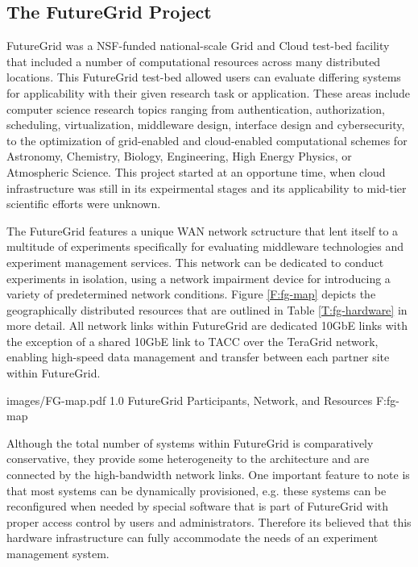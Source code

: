 \subsection{The FutureGrid Project}


FutureGrid was a NSF-funded national-scale Grid and Cloud test-bed facility that included a number of computational resources across many distributed locations.  This FutureGrid test-bed allowed users can evaluate differing systems for applicability with their given research task or application. These areas include computer science research topics ranging from authentication, authorization, scheduling, virtualization, middleware design, interface design and cybersecurity, to the optimization of grid-enabled and cloud-enabled computational schemes for  Astronomy, Chemistry, Biology, Engineering, High Energy Physics, or Atmospheric Science. This project started at an opportune time, when cloud infrastructure was still in its expeirmental stages and its applicability to mid-tier scientific efforts were unknown. 

The FutureGrid  features a unique WAN network sctructure that lent itself to a multitude of experiments specifically for evaluating middleware technologies and experiment management services.  This network can be dedicated to conduct experiments in isolation, using a network impairment device for introducing a variety of predetermined network conditions. Figure \ref{F:fg-map} depicts the geographically distributed resources that are outlined in Table \ref{T:fg-hardware} in more detail. All network links within FutureGrid are dedicated 10GbE links with the exception of a shared 10GbE link to TACC over the TeraGrid \cite{berman2001tkg, catlett2002philosophy} network, enabling high-speed data management and transfer between each partner site within FutureGrid.
   
  {images/FG-map.pdf}
  {1.0}
  {FutureGrid Participants, Network, and Resources}
  {F:fg-map}

Although the total number of systems within FutureGrid is comparatively conservative, they provide some heterogeneity to the architecture and are connected by the high-bandwidth network links. One important feature to note is that most systems can be dynamically provisioned, e.g. these systems can be reconfigured when needed by special software that is part of FutureGrid with proper access control by users and administrators.  Therefore its believed that this hardware infrastructure can fully accommodate the needs of an experiment management system.

